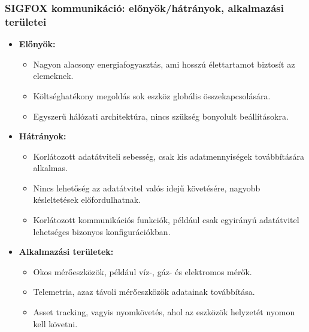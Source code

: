 \subsubsection{SIGFOX kommunikáció: előnyök/hátrányok, alkalmazási területei}
\begin{itemize}
    \item \textbf{Előnyök:}
    \begin{itemize}
        \item Nagyon alacsony energiafogyasztás, ami hosszú élettartamot biztosít az elemeknek.
        \item Költséghatékony megoldás sok eszköz globális összekapcsolására.
        \item Egyszerű hálózati architektúra, nincs szükség bonyolult beállításokra.
    \end{itemize}
    \item \textbf{Hátrányok:}
    \begin{itemize}
        \item Korlátozott adatátviteli sebesség, csak kis adatmennyiségek továbbítására alkalmas.
        \item Nincs lehetőség az adatátvitel valós idejű követésére, nagyobb késleltetések előfordulhatnak.
        \item Korlátozott kommunikációs funkciók, például csak egyirányú adatátvitel lehetséges bizonyos konfigurációkban.
    \end{itemize}
    \item \textbf{Alkalmazási területek:}
    \begin{itemize}
        \item Okos mérőeszközök, például víz-, gáz- és elektromos mérők.
        \item Telemetria, azaz távoli mérőeszközök adatainak továbbítása.
        \item Asset tracking, vagyis nyomkövetés, ahol az eszközök helyzetét nyomon kell követni.
    \end{itemize}
\end{itemize}

